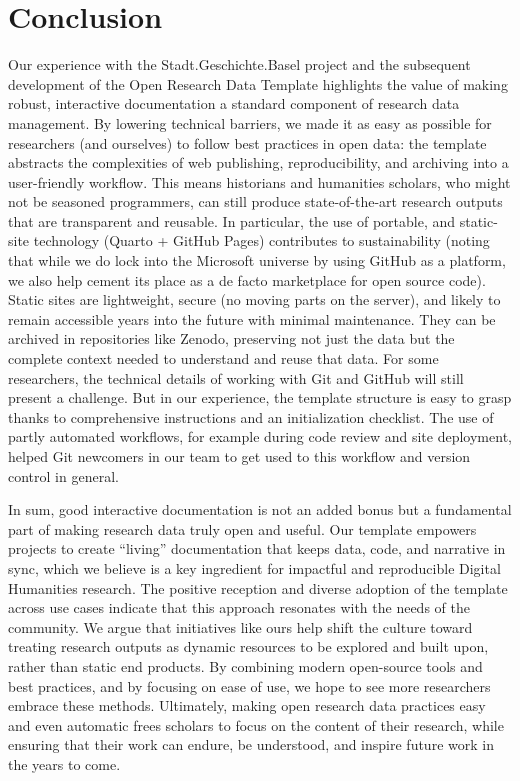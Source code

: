 \documentclass[final]{anthology-ch} %
\begin{document}
\section{Conclusion}\label{conclusion}

Our experience with the Stadt.Geschichte.Basel project and the subsequent development of the Open Research Data Template highlights the value of making robust, interactive documentation a standard component of research data management. By lowering technical barriers, we made it as easy as possible for researchers (and ourselves) to follow best practices in open data: the template abstracts the complexities of web publishing, reproducibility, and archiving into a user-friendly workflow. This means historians and humanities scholars, who might not be seasoned programmers, can still produce state-of-the-art research outputs that are transparent and reusable. In particular, the use of portable, and static-site technology (Quarto + GitHub Pages) contributes to sustainability (noting that while we do lock into the Microsoft universe by using GitHub as a platform, we also help cement its place as a de facto marketplace for open source code). Static sites are lightweight, secure (no moving parts on the server), and likely to remain accessible years into the future with minimal maintenance. They can be archived in repositories like Zenodo, preserving not just the data but the complete context needed to understand and reuse that data. For some researchers, the technical details of working with Git and GitHub will still present a challenge. But in our experience, the template structure is easy to grasp thanks to comprehensive instructions and an initialization checklist. The use of partly automated workflows, for example during code review and site deployment, helped Git newcomers in our team to get used to this workflow and version control in general.

In sum, good interactive documentation is not an added bonus but a fundamental part of making research data truly open and useful. Our template empowers projects to create ``living'' documentation that keeps data, code, and narrative in sync, which we believe is a key ingredient for impactful and reproducible Digital Humanities research. The positive reception and diverse adoption of the template across use cases indicate that this approach resonates with the needs of the community. We argue that initiatives like ours help shift the culture toward treating research outputs as dynamic resources to be explored and built upon, rather than static end products. By combining modern open-source tools and best practices, and by focusing on ease of use, we hope to see more researchers embrace these methods. Ultimately, making open research data practices easy and even automatic frees scholars to focus on the content of their research, while ensuring that their work can endure, be understood, and inspire future work in the years to come.
\end{document}
